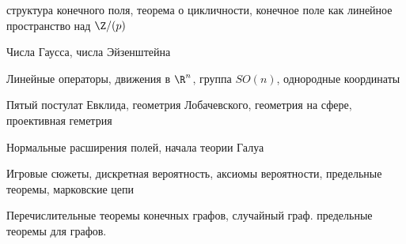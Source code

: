 структура конечного поля, теорема о цикличности, конечное поле как линейное пространство над $\Z/(p)$

Числа Гаусса, числа Эйзенштейна

Линейные операторы, движения в $\R^n$, группа $SO(n)$, однородные координаты

Пятый постулат Евклида, геометрия Лобачевского, геометрия на сфере, проективная геметрия

Нормальные расширения полей, начала теории Галуа

Игровые сюжеты, дискретная вероятность, аксиомы вероятности, предельные теоремы, марковские цепи

Перечислительные теоремы конечных графов, случайный граф. предельные теоремы для графов.
